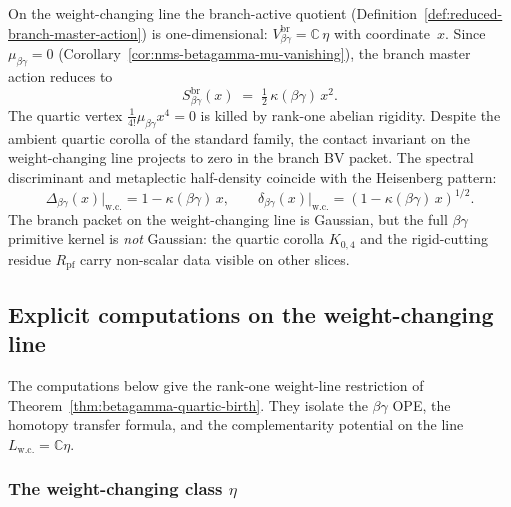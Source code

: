 \begin{computation}
\label{comp:betagamma-branch-bv}
On the weight-changing line the branch-active quotient
\textup{(}Definition~\textup{\ref{def:reduced-branch-master-action})}
is one-dimensional: $V_{\beta\gamma}^{\mathrm{br}} = \mathbb{C}\,\eta$
with coordinate~$x$. Since $\mu_{\beta\gamma} = 0$
(Corollary~\ref{cor:nms-betagamma-mu-vanishing}), the branch
master action reduces to
\begin{equation}\label{eq:betagamma-branch-action}
S_{\beta\gamma}^{\mathrm{br}}(x)
\;=\;
\tfrac{1}{2}\,\kappa(\beta\gamma)\,x^2.
\end{equation}
The quartic vertex $\frac{1}{4!}\mu_{\beta\gamma} x^4 = 0$
is killed by rank-one abelian rigidity.
Despite the ambient quartic corolla of the standard family, the
contact invariant on the weight-changing line projects to zero in the
branch BV packet. The spectral discriminant and metaplectic half-density
coincide with the Heisenberg pattern:
\begin{equation}\label{eq:betagamma-metaplectic}
\Delta_{\beta\gamma}(x)\big|_{\mathrm{w.c.}} = 1 - \kappa(\beta\gamma)\,x,
\qquad
\delta_{\beta\gamma}(x)\big|_{\mathrm{w.c.}} = (1 - \kappa(\beta\gamma)\,x)^{1/2}.
\end{equation}
The branch packet on the weight-changing line is Gaussian, but the
full $\beta\gamma$ primitive kernel is \emph{not} Gaussian: the
quartic corolla $K_{0,4}$ and the rigid-cutting residue
$R_{\mathrm{pf}}$ carry non-scalar data visible on other slices.
\end{computation}

\subsection{Explicit computations on the weight-changing line}
\label{subsec:betagamma-explicit-weight-line}

The computations below give the rank-one weight-line restriction of
Theorem~\ref{thm:betagamma-quartic-birth}. They isolate the
$\beta\gamma$ OPE, the homotopy transfer formula, and the
complementarity potential on the line
$L_{\mathrm{w.c.}}=\mathbb C\eta$.

\subsubsection{The weight-changing class \texorpdfstring{$\eta$}{eta}}
\label{sssec:betagamma-eta-class}

